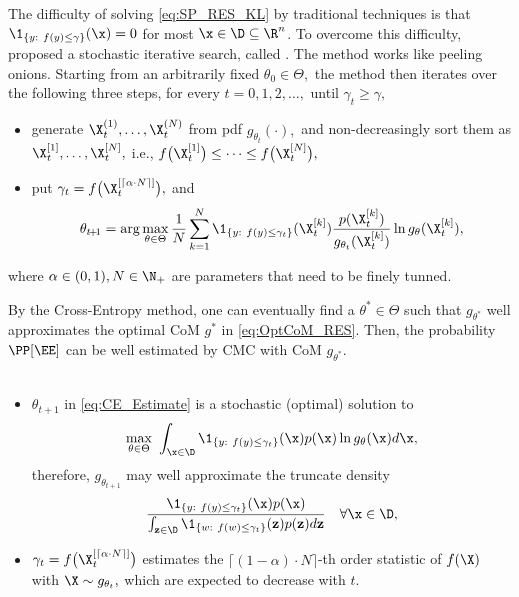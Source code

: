 		The difficulty of solving \eqref{eq:SP_RES_KL} by traditional 
		techniques is that $\1_{\{y:\ f(y)\le \gamma\}}(\x)=0$ for most
		$\x\in\D \subseteq  \R^n$.  To overcome this difficulty,
		 proposed a stochastic 
		iterative search, called .
		The method works like peeling onions. Starting from an arbitrarily
		fixed $\theta_0\in \Theta,$ the method then iterates over the following
		three steps, for every $t=0,1, 2, \ldots, $ until $\gamma_t \ge \gamma,$
		\begin{itemize}
			\item generate $\X_t^{(1)}, \ldots, \X_t^{(N)}$ from pdf 
			$g_{\theta_t}(\cdot),$ and non-decreasingly sort them as $\X_t^{[1]}, \ldots, \X_t^{[N]},$ i.e., 
			$f\big(\X_t^{[1]}\big)\le \cdots \le f\big(\X_t^{[N]}\big),$
			\item put $\gamma_t=f\big(\X_t^{[\lceil\alpha \cdot N\rceil]}\big),$ and
			\begin{equation}\label{eq:CE_Estimate}
				\theta_{t\!+\!1} = \arg\max_{\theta\in \Theta}\frac{1}{N}\sum_{k=1}^{N} \1_{\{y:\ f(y)\le \gamma_t\}}(\X_t^{[k]})\frac{p(\X_t^{[k]})}{g_{\theta_t}(\X_t^{[k]})} \ln g_{\theta}(\X_t^{[k]}),
			\end{equation} 
		\end{itemize}
		where $\alpha\in (0,1), N \in \N_+$ are parameters that need to be finely tunned. 

                  By the Cross-Entropy method, one can eventually find a $\theta^*\in \Theta$
                  such that $g_{\theta^*}$ well approximates the optimal CoM $g^*$ in \eqref{eq:OptCoM_RES}. Then, the probability $\PP[\EE]$ can be well estimated by CMC with CoM $g_{\theta^*}.$\\[1ex]
			\\[1ex]
			\begin{itemize}
				\item $\theta_{t\!+\!1}$ in \eqref{eq:CE_Estimate} is a stochastic (optimal) solution to	
				\begin{equation}\label{eq:CE_Iter_Obj}
				\max_{\theta\in \Theta}\ \int_{\x\in \D} \1_{\{y:\ f(y)\le \gamma_t\}}(\x)p(\x) \ln g_{\theta}(\x)d\x,
				\end{equation} 
				therefore, $g_{\theta_{t\!+\!1}}$ may well approximate
				the truncate density 
				\begin{equation}\label{eq:CE_Iter_Obj_Truncate}
					\frac{\1_{\{y:\ f(y)\le \gamma_t\}}(\x)p(\x)}{
						\int_{\mathbf{z}\in \D} \1_{\{w:\ f(w)\le \gamma_t\}}(\mathbf{z})p(\mathbf{z}) d \mathbf{z}
						}\quad \forall \x\in \D,
				\end{equation}
				\item $\gamma_t=f\big( \X_t^{[\lceil \alpha \cdot N \rceil]} \big)$
				estimates the $\lceil (1-\alpha) \cdot N \rceil$-th order statistic of
				$f(\X)$ with $\X \sim g_{\theta_t},$ which are expected to decrease
				with $t.$ 
			\end{itemize}

